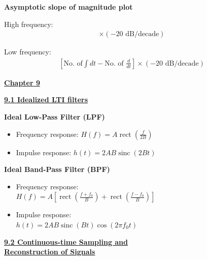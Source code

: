 \documentclass[landscape,a4paper]{extarticle}
\newenvironment{Figure}
  {\noindent\minipage{\linewidth}}
  {\endminipage\par\medskip}
\newcommand{\rect}[1]{\operatorname{rect}\left(#1\right)}
\newcommand{\sinc}[1]{\operatorname{sinc}\left(#1\right)}
\begin{document}
\begin{multicols*}{5}
    \textbf{Asymptotic slope of magnitude plot}

    High frequency:
    \begin{align*}
        [\text{Pole-zero excess}] \times (-20 \text{ dB/decade}) \tag{8.5a}
    \end{align*}

    Low frequency:
    \begin{align*}
        \left[\text{No. of} \int dt - \text{No. of } \frac{d}{dt}\right] \times (-20 \text{ dB/decade}) \tag{8.5a}
    \end{align*}

    \textbf{\uline{Chapter 9}}

    \textbf{\uline{9.1 Idealized LTI filters}}

    \textbf{Ideal Low-Pass Filter (LPF)}
    \begin{itemize}
        \item Frequency response: $H(f) = A\rect{\frac{f}{2B}}$
        \item Impulse response: $h(t) = 2AB\sinc{2Bt}$
    \end{itemize}


    \textbf{Ideal Band-Pass Filter (BPF)}
    \begin{itemize}
        \item Frequency response:\\
        $H(f) = A \left[\rect{\frac{f + f_0}{B}} + \rect{\frac{f - f_0}{B}}\right]$
        \item Impulse response:\\
        $h(t)=2AB\sinc{Bt}\cos{(2\pi f_0t)}$
    \end{itemize}


    \textbf{\uline{9.2 Continuous-time Sampling and\\Reconstruction of Signals}}




\end{multicols*}
\end{document}

